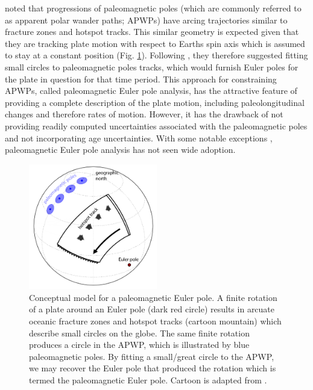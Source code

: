 \documentclass[11pt,letterpaper]{article}
\begin{document}
\cite{Gordon1984a} noted that progressions of paleomagnetic poles (which are commonly referred to as apparent polar wander paths; APWPs) have arcing trajectories similar to fracture zones and hotspot tracks. This similar geometry is expected given that they are tracking plate motion with respect to Earths spin axis which is assumed to stay at a constant position (Fig. \ref{fig:pep}). Following \cite{Francheteau1969a}, they therefore suggested fitting small circles to paleomagnetic poles tracks, which would furnish Euler poles for the plate in question for that time period. This approach for constraining APWPs, called paleomagnetic Euler pole analysis, has the attractive feature of providing a complete description of the plate motion, including paleolongitudinal changes and therefore rates of motion. However, it has the drawback of not providing readily computed uncertainties associated with the paleomagnetic poles and not incorporating age uncertainties. With some notable exceptions \citep[e.g.][]{Bryan1986a, Beck1989a, Tarling1996a, Beck2003a, Smirnov2010a}, paleomagnetic Euler pole analysis has not seen wide adoption.

\begin{figure}
\includegraphics[width=0.5\textwidth]{fig_PEP_annotated.png}
\caption{Conceptual model for a paleomagnetic Euler pole. A finite rotation of a plate around an Euler pole (dark red circle) results in arcuate oceanic fracture zones and hotspot tracks (cartoon mountain) which describe small circles on the globe. The same finite rotation produces a circle in the APWP, which is illustrated by blue paleomagnetic poles. By fitting a small/great circle to the APWP, we may recover the Euler pole that produced the rotation which is termed the paleomagnetic Euler pole. Cartoon is adapted from \cite{Gordon1984a}.}
\label{fig:pep}
\end{figure}
\end{document}
